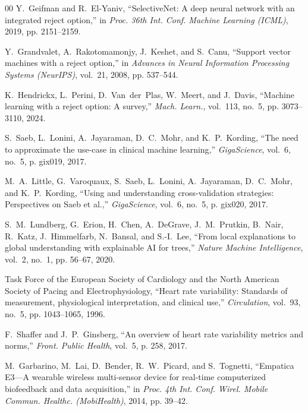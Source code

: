\documentclass[conference]{IEEEtran}
\begin{document}
\begin{thebibliography}{00}
Y.~Geifman and R.~El-Yaniv, ``SelectiveNet: A deep neural network with an integrated reject option,'' in \textit{Proc. 36th Int. Conf. Machine Learning (ICML)}, 2019, pp. 2151--2159.

Y.~Grandvalet, A.~Rakotomamonjy, J.~Keshet, and S.~Canu, ``Support vector machines with a reject option,'' in \textit{Advances in Neural Information Processing Systems (NeurIPS)}, vol.~21, 2008, pp. 537--544.

K.~Hendrickx, L.~Perini, D.~Van~der~Plas, W.~Meert, and J.~Davis, ``Machine learning with a reject option: A survey,'' \textit{Mach. Learn.}, vol.~113, no.~5, pp. 3073--3110, 2024.

S.~Saeb, L.~Lonini, A.~Jayaraman, D.~C.~Mohr, and K.~P.~Kording, ``The need to approximate the use-case in clinical machine learning,'' \textit{GigaScience}, vol.~6, no.~5, p. gix019, 2017.

M.~A.~Little, G.~Varoquaux, S.~Saeb, L.~Lonini, A.~Jayaraman, D.~C.~Mohr, and K.~P.~Kording, ``Using and understanding cross-validation strategies: Perspectives on Saeb et al.,'' \textit{GigaScience}, vol.~6, no.~5, p. gix020, 2017.

S.~M.~Lundberg, G.~Erion, H.~Chen, A.~DeGrave, J.~M.~Prutkin, B.~Nair, R.~Katz, J.~Himmelfarb, N.~Bansal, and S.-I.~Lee, ``From local explanations to global understanding with explainable AI for trees,'' \textit{Nature Machine Intelligence}, vol.~2, no.~1, pp. 56--67, 2020.

Task Force of the European Society of Cardiology and the North American Society of Pacing and Electrophysiology, ``Heart rate variability: Standards of measurement, physiological interpretation, and clinical use,'' \textit{Circulation}, vol.~93, no.~5, pp. 1043--1065, 1996.

F.~Shaffer and J.~P.~Ginsberg, ``An overview of heart rate variability metrics and norms,'' \textit{Front. Public Health}, vol.~5, p. 258, 2017.

M.~Garbarino, M.~Lai, D.~Bender, R.~W.~Picard, and S.~Tognetti, ``Empatica E3---A wearable wireless multi-sensor device for real-time computerized biofeedback and data acquisition,'' in \textit{Proc. 4th Int. Conf. Wirel. Mobile Commun. Healthc. (MobiHealth)}, 2014, pp. 39--42.


\end{thebibliography}
\end{document}
